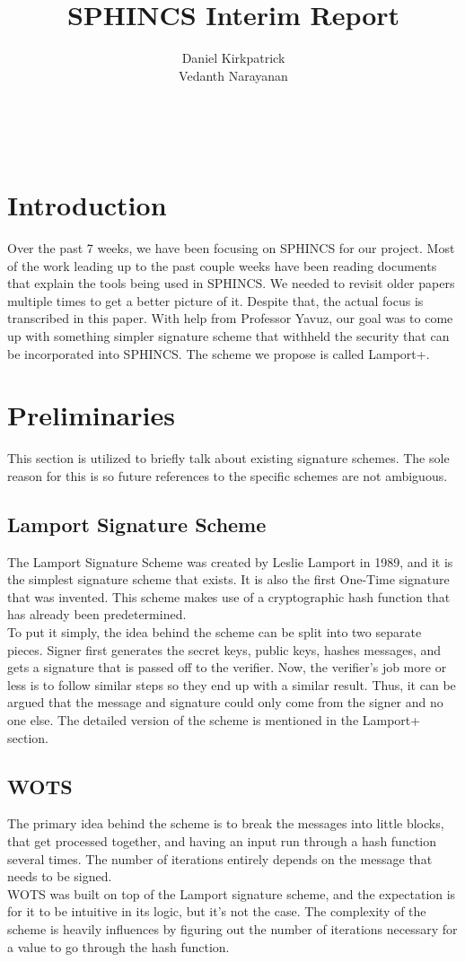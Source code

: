 \documentclass[]{scrartcl}
\title{SPHINCS Interim Report}
\author{Daniel Kirkpatrick\\Vedanth Narayanan}
\makeatletter
\renewcommand{\maketitle}{ %
	\begin{center} %
		{\LARGE\@title} %
		
		\vspace{15pt} %
		{\large\@author} %
		\\\@date %
		
	\end{center}
}
\makeatother
\begin{document}
\maketitle


\section*{Introduction}
Over the past 7 weeks, we have been focusing on SPHINCS for our project. Most of the work leading up to the past couple weeks have been reading documents that explain the tools being used in SPHINCS. We needed to revisit older papers multiple times to get a better picture of it. Despite that, the actual focus is transcribed in this paper. With help from Professor Yavuz, our goal was to come up with something simpler signature scheme that withheld the security that can be incorporated into SPHINCS. The scheme we propose is called Lamport+.

\section*{Preliminaries}
\vspace{-0.3cm}This section is utilized to briefly talk about existing signature schemes. The sole reason for this is so future references to the specific schemes are not ambiguous. 

\subsection*{Lamport Signature Scheme}
The Lamport Signature Scheme was created by Leslie Lamport in 1989, and it is the simplest signature scheme that exists. It is also the first One-Time signature that was invented. This scheme makes use of a cryptographic hash function that has already been predetermined.\\
To put it simply, the idea behind the scheme can be split into two separate pieces. Signer first generates the secret keys, public keys, hashes messages, and gets a signature that is passed off to the verifier. Now, the verifier's job more or less is to follow similar steps so they end up with a similar result. Thus, it can be argued that the message and signature could only come from the signer and no one else. The detailed version of the scheme is mentioned in the Lamport+ section.

\subsection*{WOTS}
The primary idea behind the scheme is to break the messages into little blocks, that get processed together, and having an input run through a hash function several times. The number of iterations entirely depends on the message that needs to be signed.\\
WOTS was built on top of the Lamport signature scheme, and the expectation is for it to be intuitive in its logic, but it's not the case. The complexity of the scheme is heavily influences by figuring out the number of iterations necessary for a value to go through the hash function.
\end{document}

